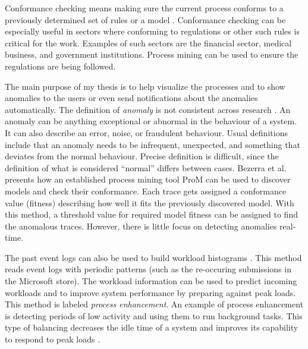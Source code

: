 Conformance checking means making sure the current process conforms to a previously determined set of rules or a model \cite{chomyat2016process}.
Conformance checking can be especially useful in sectors where conforming to regulations or other such rules is critical for the work.
Examples of such sectors are the financial sector, medical business, and government institutions.
Process mining can be used to ensure the regulations are being followed.

The main purpose of my thesis is to help visualize the processes and to show anomalies to the users or even send notifications about the anomalies automatically.
The definition of \textit{anomaly} is not consistent across research \cite{bezerra2009anomaly}. 
An anomaly can be anything exceptional or abnormal in the behaviour of a system. 
It can also describe an error, noise, or fraudulent behaviour.
Usual definitions include that an anomaly needs to be infrequent, unexpected, and something that deviates from the normal behaviour.
Precise definition is difficult, since the definition of what is considered ``normal'' differs between cases. 
Bezerra et al. \cite{bezerra2009anomaly} presents how an established process mining tool ProM can be used to discover models and check their conformance.
Each trace gets assigned a conformance value (fitness) describing how well it fits the previously discovered model.
With this method, a threshold value for required model fitness can be assigned to find the anomalous traces.
However, there is little focus on detecting anomalies real-time.

The past event logs can also be used to build workload histograms \cite{getta2014mining}.
This method reads event logs with periodic patterns (such as the re-occuring submissions in the Microsoft store).
The workload information can be used to predict incoming workloads and to improve system performance by preparing against peak loads.
This method is labeled \textit{process enhancement}. 
An example of process enhancement is detecting periods of low activity and using them to run background tasks.
This type of balancing decreases the idle time of a system and improves its capability to respond to peak loads \cite{getta2014mining}.